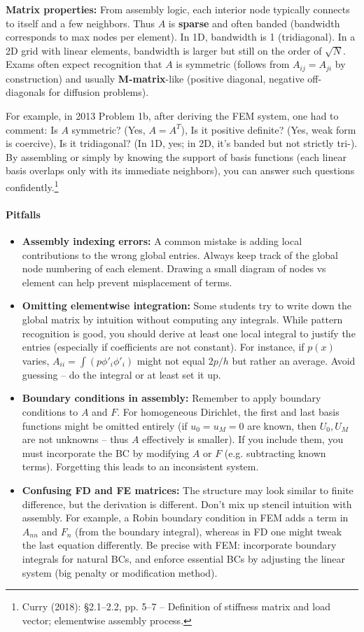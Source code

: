 \documentclass[a4paper,11pt]{article}
\begin{document}
\textbf{Matrix properties:} From assembly logic, each interior node typically connects to itself and a few neighbors. Thus $A$ is \textbf{sparse} and often banded (bandwidth corresponds to max nodes per element). In 1D, bandwidth is 1 (tridiagonal). In a 2D grid with linear elements, bandwidth is larger but still on the order of $\sqrt{N}$. Exams often expect recognition that $A$ is symmetric (follows from $A_{ij}=A_{ji}$ by construction) and usually \textbf{M-matrix}-like (positive diagonal, negative off-diagonals for diffusion problems).

For example, in 2013 Problem 1b, after deriving the FEM system, one had to comment: Is $A$ symmetric? (Yes, $A=A^T$), Is it positive definite? (Yes, weak form is coercive), Is it tridiagonal? (In 1D, yes; in 2D, it's banded but not strictly tri-). By assembling or simply by knowing the support of basis functions (each linear basis overlaps only with its immediate neighbors), you can answer such questions confidently.\footnote{Curry (2018): §2.1--2.2, pp. 5--7 -- Definition of stiffness matrix and load vector; elementwise assembly process.}

\paragraph{Pitfalls}
\begin{itemize}
    \item \textbf{Assembly indexing errors:} A common mistake is adding local contributions to the wrong global entries. Always keep track of the global node numbering of each element. Drawing a small diagram of nodes vs element can help prevent misplacement of terms.
    \item \textbf{Omitting elementwise integration:} Some students try to write down the global matrix by intuition without computing any integrals. While pattern recognition is good, you should derive at least one local integral to justify the entries (especially if coefficients are not constant). For instance, if $p(x)$ varies, $A_{ii} = \int (p\phi'_i\phi'_i)$ might not equal $2p/h$ but rather an average. Avoid guessing -- do the integral or at least set it up.
    \item \textbf{Boundary conditions in assembly:} Remember to apply boundary conditions to $A$ and $F$. For homogeneous Dirichlet, the first and last basis functions might be omitted entirely (if $u_0=u_M=0$ are known, then $U_0,U_M$ are not unknowns -- thus $A$ effectively is smaller). If you include them, you must incorporate the BC by modifying $A$ or $F$ (e.g. subtracting known terms). Forgetting this leads to an inconsistent system.
    \item \textbf{Confusing FD and FE matrices:} The structure may look similar to finite difference, but the derivation is different. Don't mix up stencil intuition with assembly. For example, a Robin boundary condition in FEM adds a term in $A_{nn}$ and $F_n$ (from the boundary integral), whereas in FD one might tweak the last equation differently. Be precise with FEM: incorporate boundary integrals for natural BCs, and enforce essential BCs by adjusting the linear system (big penalty or modification method).
\end{itemize}
\end{document}
